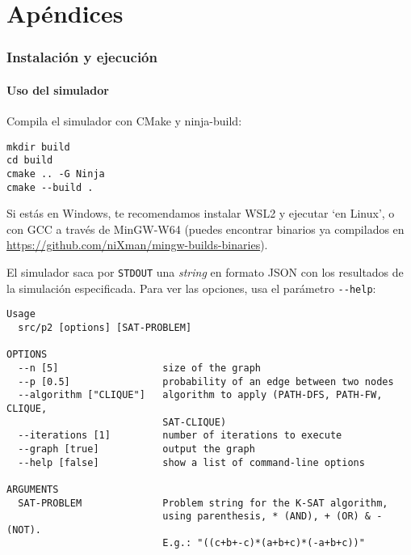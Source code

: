 \part{Apéndices}

\section*{Instalación y ejecución}

\subsection*{Uso del simulador}\label{sec:compilation}
Compila el simulador con CMake y ninja-build:
\begin{verbatim}
mkdir build
cd build
cmake .. -G Ninja
cmake --build .
\end{verbatim}
Si estás en Windows, te recomendamos instalar WSL2 y ejecutar `en Linux', o con GCC a través de MinGW-W64 (puedes encontrar binarios ya compilados en \url{https://github.com/niXman/mingw-builds-binaries}).

El simulador saca por \texttt{STDOUT} una \textit{string} en formato JSON con los resultados de la simulación especificada. Para ver las opciones, usa el parámetro \texttt{-{}-help}:
\begin{verbatim}
Usage
  src/p2 [options] [SAT-PROBLEM]

OPTIONS
  --n [5]                  size of the graph
  --p [0.5]                probability of an edge between two nodes
  --algorithm ["CLIQUE"]   algorithm to apply (PATH-DFS, PATH-FW, CLIQUE,
                           SAT-CLIQUE)
  --iterations [1]         number of iterations to execute
  --graph [true]           output the graph
  --help [false]           show a list of command-line options

ARGUMENTS
  SAT-PROBLEM              Problem string for the K-SAT algorithm,
                           using parenthesis, * (AND), + (OR) & - (NOT).
                           E.g.: "((c+b+-c)*(a+b+c)*(-a+b+c))"
\end{verbatim}



